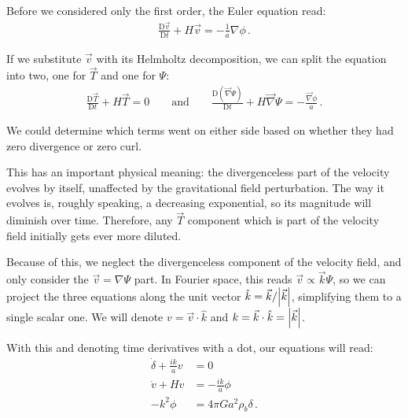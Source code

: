 \documentclass[main.tex]{subfiles}
\begin{document}
Before we considered only the first order, the Euler equation read:
%
\begin{align}
  \frac{\mathrm{D} \vec{v}}{\mathrm{D}t}  
  + H \vec{v} = - \frac{1}{a} \nabla \phi 
\,.
\end{align}

If we substitute \(\vec{v}\) with its Helmholtz decomposition, we can split the equation into two, one for \(\vec{T}\) and one for \(\Psi \):
%
\begin{align}
  \frac{\mathrm{D} \vec{T}}{\mathrm{D}t} + H \vec{T} = 0
  \qquad \text{and} \qquad
  \frac{\mathrm{D} (\vec{\nabla} \Psi )}{\mathrm{D}t} + H \vec{\nabla} \Psi = - \frac{\vec{\nabla} \phi}{a}
\,.
\end{align}

We could determine which terms went on either side based on whether they had zero divergence or zero curl.


This has an important physical meaning: the divergenceless part of the velocity evolves by itself, unaffected by the gravitational field perturbation. The way it evolves is, roughly speaking, a decreasing exponential, so its magnitude will diminish over time. 
Therefore, any \(\vec{T}\) component which is part of the velocity field initially gets ever more diluted.

Because of this, we neglect the divergenceless component of the velocity field, and only consider the \(\vec{v} = \nabla \Psi \) part. 
In Fourier space, this reads \(\vec{v} \propto \vec{k} \Psi \), so we can project the three equations along the unit vector \(\hat{k} = \vec{k} / \abs{\vec{k}}\), simplifying them to a single scalar one.
We will denote \(v = \vec{v} \cdot \hat{k}\) and \(k= \vec{k} \cdot \hat{k} = \abs{\vec{k}}\).

With this and denoting time derivatives with a dot, our equations will read:
%
\begin{align}
  \dot{\delta} + \frac{ik}{a} v &= 0 
  \label{eq:linearized-continuity}
  \\
  \dot{v} + H v &= - \frac{ik}{a} \phi \\
  - k^2 \phi &= 4 \pi G a^2 \rho_b \delta
\,.
\end{align}
\end{document}
